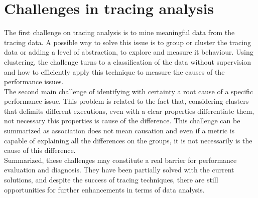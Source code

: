 \section{Challenges in tracing analysis}  %
The first challenge on tracing analysis is to mine meaningful data from the tracing data. A possible way to solve this issue is to group or cluster the tracing data or adding a level of abstraction, to explore and measure it behaviour. Using clustering, the challenge turns to a classification of the data without supervision and how to efficiently apply this technique to measure the causes of the performance issues.\\
The second main challenge of identifying with certainty a root cause of a specific performance issue. This problem is related to the fact that, considering clusters that delimits different executions, even with a clear properties differentiate them, not necessary this properties is cause of the difference. This challenge can be summarized as association does not mean causation and even if a metric is capable of explaining all the differences on the groups, it is not necessarily is the cause of this difference.\\
Summarized, these challenges may constitute a real barrier for performance evaluation and diagnosis. They have been partially solved with the current solutions, and despite the success of tracing techniques, there are still opportunities for further enhancements in terms of data analysis.


